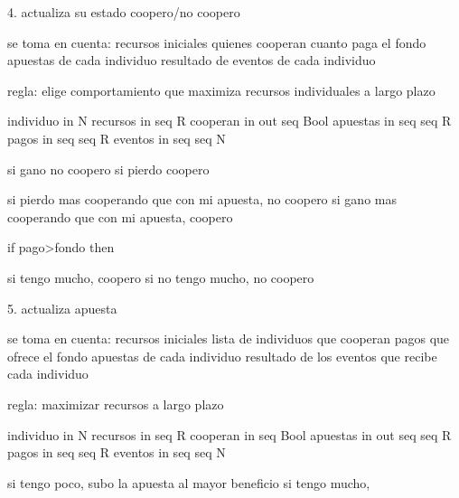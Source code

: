4. actualiza su estado coopero/no coopero

se toma en cuenta:
    recursos iniciales
    quienes cooperan
    cuanto paga el fondo
    apuestas de cada individuo
    resultado de eventos de cada individuo

regla:
    elige comportamiento que maximiza recursos individuales a largo plazo



individuo   in      N
recursos    in      seq R
cooperan    in out  seq Bool
apuestas    in      seq seq R
pagos       in      seq seq R
eventos     in      seq seq N


si gano no coopero
si pierdo coopero


si pierdo mas cooperando que con mi apuesta, no coopero
si gano mas cooperando que con mi apuesta, coopero


if pago>fondo then 


si tengo mucho, coopero
si no tengo mucho, no coopero




5. actualiza apuesta


se toma en cuenta:
    recursos iniciales
    lista de individuos que cooperan
    pagos que ofrece el fondo
    apuestas de cada individuo
    resultado de los eventos que recibe cada individuo

regla:
    maximizar recursos a largo plazo

individuo   in      N
recursos    in      seq R
cooperan    in      seq Bool
apuestas    in out  seq seq R
pagos       in      seq seq R
eventos     in      seq seq N

si tengo poco, subo la apuesta al mayor beneficio
si tengo mucho, 
